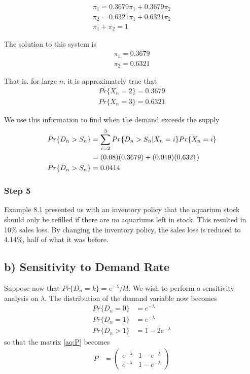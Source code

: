 \documentclass[11pt,letterpaper]{article}
\begin{document}
\begin{align*}
\pi_1 = 0.3679\pi_1 + 0.3679\pi_2 \\
\pi_2 = 0.6321\pi_1 + 0.6321\pi_2 \\
\pi_1 + \pi_2 = 1
\end{align*}

The solution to this system is
\begin{equation} \label{aq:steady}
	\begin{aligned}
	\pi_1 = 0.3679 \\
	\pi_2 = 0.6321
    \end{aligned}
\end{equation}

That is, for large $n$, it is approximately true that
\begin{align*}
Pr\{X_n = 2\} = 0.3679 \\
Pr\{X_n = 3\} = 0.6321
\end{align*}

We use this information to find when the demand exceeds the supply
\begin{align} \label{aq:ans}
Pr\{D_n > S_n\} & = \sum_{i=2}^{3} Pr\{D_n > S_n | X_n = i\} Pr\{X_n = i\} \notag \\
& = (0.08)(0.3679) + (0.019)(0.6321) \notag \\
Pr\{D_n > S_n\} & = 0.0414
\end{align}




\subsubsection*{Step 5}
Example 8.1 presented us with an inventory policy that the aquarium stock should only be refilled if there are no aquariums left in stock. This resulted in 10\% sales loss. By changing the inventory policy, the sales loss is reduced to 4.14\%, half of what it was before.










\subsection*{b) Sensitivity to Demand Rate}

Suppose now that $Pr\{D_n = k\} = e^{-\lambda}/k!$. We wish to perform a sensitivity analysis on $\lambda$. The distribution of the demand variable now becomes
\begin{align*}
Pr\{D_n = 0\} & = e^{-\lambda} \\
Pr\{D_n = 1\} & = e^{-\lambda} \\
Pr\{D_n > 1\} & = 1-2e^{-\lambda}
\end{align*}
so that the matrix \eqref{aq:P} becomes
\begin{align} \label{aq:sense:P}
P & =
	\begin{pmatrix}
    e^{-\lambda} & 1-e^{-\lambda} \\
    e^{-\lambda} & 1-e^{-\lambda}
    \end{pmatrix}
\end{align}
\end{document}
